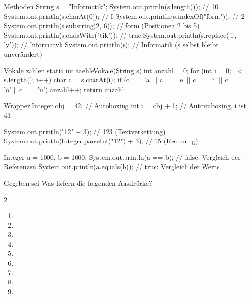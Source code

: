 \begin{javacode}[Ausschnitt]{Methoden}
String s = "Informatik";
System.out.println(s.length());             // 10
System.out.println(s.charAt(0));            // I
System.out.println(s.indexOf("form"));      // 2
System.out.println(s.substring(2, 6));      // form   (Positionen 2 bis 5)
System.out.println(s.endsWith("tik"));      // true
System.out.println(s.replace('i', 'y'));    // Informatyk
System.out.println(s);                      // Informatik  (s selbst bleibt unverändert)
\end{javacode}

\begin{javacode}[Ausschnitt]{Vokale zählen}
static int zaehleVokale(String s) {
	int anzahl = 0;
	for (int i = 0; i < s.length(); i++) {
		char c = s.charAt(i);
		if (c == 'a' || c == 'e' || c == 'i' || c == 'o' || c == 'u') {
			anzahl++;
		}
	}
	return anzahl;
}
\end{javacode}

\begin{javacode}[Ausschnitt]{Wrapper}
Integer obj = 42;                               // Autoboxing
int i = obj + 1;                                // Autounboxing, i ist 43

System.out.println("12" + 3);                   // 123  (Textverkettung)
System.out.println(Integer.parseInt("12") + 3); // 15   (Rechnung)

Integer a = 1000, b = 1000;
System.out.println(a == b);                     // false: Vergleich der Referenzen
System.out.println(a.equals(b));                // true:  Vergleich der Werte
\end{javacode}

\aufgaben
{}
Gegeben sei  Was liefern die folgenden Ausdrücke?
\begin{multicols}{2}
\begin{enumerate}[label=\alph*)]
\item {}
\item {}
\item {}
\item {}
\item {}
\item {}
\item {}
\item {}
\item {}
\end{enumerate}
\end{multicols}

